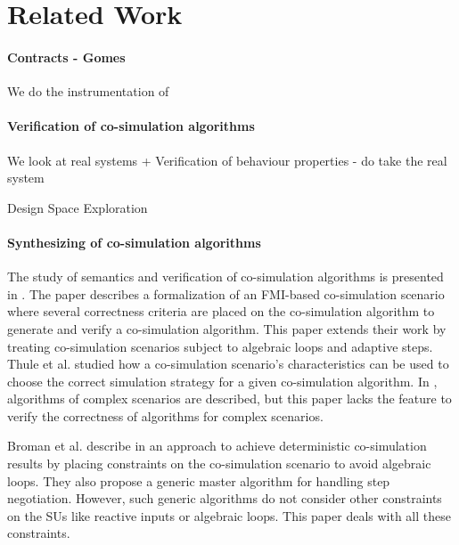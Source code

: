 \section{Related Work}\label{sc:related}

\paragraph{Contracts - Gomes}
We do the instrumentation of 

\paragraph{Verification of co-simulation algorithms}
We look at real systems + Verification of behaviour properties - do take the real system 

Design Space Exploration

\paragraph{Synthesizing of co-simulation algorithms}



The study of semantics and verification of co-simulation algorithms is presented in \cite{Gomes2019c,Gomes2019a,Broman2013}. 
The paper \cite{Gomes2019c} describes a formalization of an FMI-based co-simulation scenario where several correctness criteria are placed on the co-simulation algorithm to generate and verify a co-simulation algorithm. 
This paper extends their work by treating co-simulation scenarios subject to algebraic loops and adaptive steps.
Thule et al. \cite{Thule_2018} studied how a co-simulation scenario's characteristics can be used to choose the correct simulation strategy for a given co-simulation algorithm. 
In \cite{thrane2021}, algorithms of complex scenarios are described, but this paper lacks the feature to verify the correctness of algorithms for complex scenarios.

Broman et al. describe in \cite{Broman2013} an approach to achieve deterministic co-simulation results by placing constraints on the co-simulation scenario to avoid algebraic loops. 
They also propose a generic master algorithm for handling step negotiation. 
However, such generic algorithms do not consider other constraints on the SUs like reactive inputs or algebraic loops. This paper deals with all these constraints.

